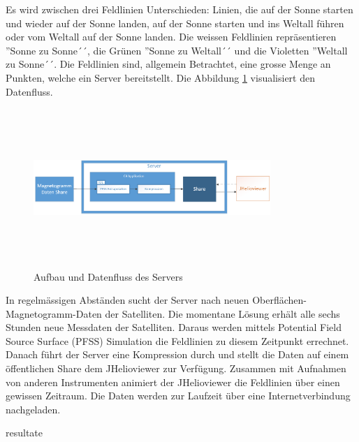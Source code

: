 Es wird zwischen drei Feldlinien Unterschieden: Linien, die auf der Sonne starten und wieder auf der Sonne landen, auf der Sonne starten und ins Weltall führen oder vom Weltall auf der Sonne landen. Die weissen Feldlinien repräsentieren ''Sonne zu Sonne´´, die Grünen ''Sonne zu Weltall´´ und die Violetten ''Weltall zu Sonne´´. Die Feldlinien sind, allgemein Betrachtet, eine grosse Menge an Punkten, welche ein Server bereitstellt. Die Abbildung \ref{einleitung::aufbau} visualisiert den Datenfluss.
\begin{figure}[!htbp]
\center
	\includegraphics[width=0.8\textwidth,height=6cm,keepaspectratio]{./pictures/einleitung/server.png}
	\caption{Aufbau und Datenfluss des Servers}
	\label{einleitung::aufbau}
\end{figure}
In regelmässigen Abständen sucht der Server nach neuen Oberflächen-Magnetogramm-Daten der Satelliten. Die momentane Lösung erhält alle sechs Stunden neue Messdaten der Satelliten. Daraus werden mittels Potential Field Source Surface (PFSS) Simulation die Feldlinien zu diesem Zeitpunkt errechnet. Danach führt der Server eine Kompression durch und stellt die Daten auf einem öffentlichen Share dem JHelioviewer zur Verfügung. Zusammen mit Aufnahmen von anderen Instrumenten animiert der JHelioviewer die Feldlinien über einen gewissen Zeitraum. Die Daten werden zur Laufzeit über eine Internetverbindung nachgeladen.

resultate




 